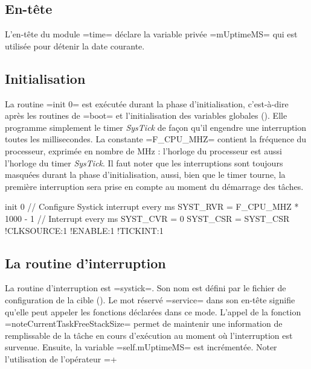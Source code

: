\subsection{En-tête}

L'en-tête du module \plm=time= déclare la variable privée \plm=mUptimeMS= qui est utilisée pour détenir la date courante.

\begin{PLM}
module time {
  var mUptimeMS $uint32 = 0
\end{PLM}



\subsection{Initialisation}

La routine \plm=init 0= est exécutée durant la phase d'initialisation, c'est-à-dire après les routines de \plm=boot= et l'initialisation des variables globales (). Elle programme simplement le timer \emph{SysTick} de façon qu'il engendre une interruption toutes les millisecondes. La constante \plm=F_CPU_MHZ= contient la fréquence du processeur, exprimée en nombre de MHz : l'horloge du processeur est aussi l'horloge du timer \emph{SysTick}. Il faut noter que les interruptions sont toujours masquées durant la phase d'initialisation, aussi, bien que le timer tourne, la première interruption sera prise en compte au moment du démarrage des tâches.

\begin{PLM}
init 0 { // Configure Systick interrupt every ms
  SYST_RVR = F_CPU_MHZ * 1000 - 1 // Interrupt every ms
  SYST_CVR = 0
  SYST_CSR = {SYST_CSR !CLKSOURCE:1 !ENABLE:1 !TICKINT:1}
}
\end{PLM}


\subsection{La routine d'interruption}

La routine d'interruption est \plm=systick=. Son nom est défini par le fichier de configuration de la cible (). Le mot réservé \plm=service= dans son en-tête signifie qu'elle peut appeler les fonctions déclarées dans ce mode. L'appel de la fonction \plm=noteCurrentTaskFreeStackSize= permet de maintenir une information de remplissable de la tâche en cours d'exécution au moment où l'interruption est survenue. Ensuite, la variable \plm=self.mUptimeMS= est incrémentée. Noter l'utilisation de l'opérateur \plm=+%

